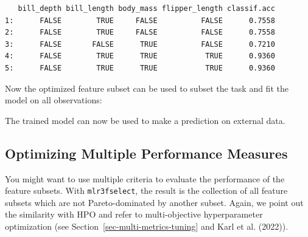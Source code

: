 \begin{Shaded}
\begin{Highlighting}[]
\SpecialCharTok{$}\NormalTok{archive)[}\SpecialCharTok{:}\NormalTok{,}
\NormalTok{  .(bill\_depth, bill\_length, body\_mass, flipper\_length, classif.acc)]}
\end{Highlighting}
\end{Shaded}

\begin{verbatim}
   bill_depth bill_length body_mass flipper_length classif.acc
1:      FALSE        TRUE     FALSE          FALSE      0.7558
2:      FALSE        TRUE     FALSE          FALSE      0.7558
3:      FALSE       FALSE      TRUE          FALSE      0.7210
4:      FALSE        TRUE      TRUE           TRUE      0.9360
5:      FALSE        TRUE      TRUE           TRUE      0.9360
\end{verbatim}

Now the optimized feature subset can be used to subset the task and fit
the model on all observations:

\begin{Shaded}
\begin{Highlighting}[]
\OtherTok{=} \NormalTok{(}\NormalTok{)}

\SpecialCharTok{$}\SpecialCharTok{$}
\SpecialCharTok{$}
\end{Highlighting}
\end{Shaded}

The trained model can now be used to make a prediction on external data.

\hypertarget{sec-multicrit-featsel}{%
\subsection{Optimizing Multiple Performance Measures}\label{sec-multicrit-featsel}}

You might want to use multiple criteria to evaluate the performance of
the feature subsets. With \texttt{mlr3fselect}, the result is the
collection of all feature subsets which are not
Pareto-dominated by another subset. Again, we
point out the similarity with HPO and refer to multi-objective
hyperparameter optimization (see Section~\ref{sec-multi-metrics-tuning}
and Karl et al. (2022)).

